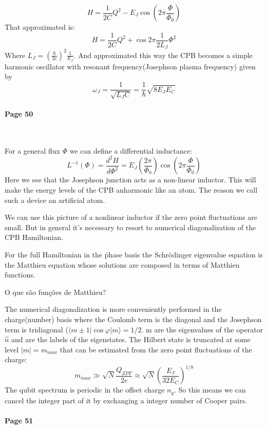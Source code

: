 \documentclass[12pt]{article}
\numberwithin{equation}{subsection}
\newcommand\ask[1]{
{\color{red}
#1
}
}
\newcommand\page[1]{
{
\color{blue}\paragraph{
Page #1
}\mbox{}\\
}
}
\begin{document}
\begin{equation}
    H = \frac{1}{2C}Q^2 - E_J \cos \left (2\pi \frac{\Phi}{\Phi_0}\right)
\end{equation}
That approximated is:
\begin{equation}
    H = \frac{1}{2C}Q^2 + \cos 2\pi \frac{1}{2L_J}\Phi^2
\end{equation}
Where $L_J = \left(\frac{\hbar}{2e}\right)^2\frac{1}{E_J}$.
And approximated this way the CPB becomes a simple harmonic oscillator with resonant frequency(Josephson plasma frequency) given by
\begin{equation}
    \omega_J = \frac{1}{\sqrt{L_JC}} = \frac{1}{\hbar}\sqrt{8E_JE_C}
\end{equation}
\page{50}
For a general flux $\Phi$ we can define a differential inductance:
\begin{equation}
    L^{-1}(\Phi)=\frac{d^2H}{d\Phi^2} = E_J \left(\frac{2\pi}{\Phi_0}\right)\cos \left(2\pi\frac{\Phi}{\Phi_0}\right)
\end{equation}
Here we see that the Josephson junction acts as a non-linear inductor. This will make the energy levels of the CPB anharmonic like an atom. The reason we call such a device an artificial atom.

We can use this picture of a nonlinear inductor if the zero point fluctuations are small. But in general it's necessary to resort to numerical diagonalization of the CPB Hamiltonian.

For the full Hamiltonian in the ṕhase basis the Schrödinger eigenvalue equation is the Matthieu equation whose solutions are composed in terms of Matthieu functions.
\ask{O que são funções de Matthieu?}
The numerical diagonalization is more conveniently performed in the charge(number) basis where the Coulomb term is the diagonal and the Josephson term is tridiagonal ($\langle m\pm1|\cos\varphi |m\rangle = 1/2$. m are the eigenvalues of the operator $\hat n$ and are the labels of the eigenstates. The Hilbert state is truncated at some level $|m|=m_{max}$ that can be estimated from the zero point fluctuations of the charge:
\begin{equation}
    m_{max} \gg \sqrt{N}\frac{Q_{ZPF}}{2e} \approx \sqrt N \left(\frac {E_J}{32E_C}\right)^{1/8}
\end{equation}
The qubit spectrum is periodic in the offset charge $n_g$. So this means we can cancel the integer part of it by exchanging a integer number of Cooper pairs. 
\page{51}
\end{document}
